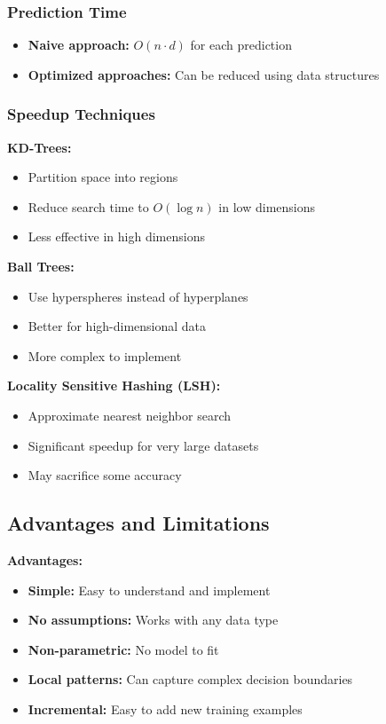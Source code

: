 \subsubsection{Prediction Time}
\begin{itemize}
    \item \textbf{Naive approach:} $O(n \cdot d)$ for each prediction
    \item \textbf{Optimized approaches:} Can be reduced using data structures
\end{itemize}

\subsubsection{Speedup Techniques}

\textbf{KD-Trees:}
\begin{itemize}
    \item Partition space into regions
    \item Reduce search time to $O(\log n)$ in low dimensions
    \item Less effective in high dimensions
\end{itemize}

\textbf{Ball Trees:}
\begin{itemize}
    \item Use hyperspheres instead of hyperplanes
    \item Better for high-dimensional data
    \item More complex to implement
\end{itemize}

\textbf{Locality Sensitive Hashing (LSH):}
\begin{itemize}
    \item Approximate nearest neighbor search
    \item Significant speedup for very large datasets
    \item May sacrifice some accuracy
\end{itemize}

\subsection{Advantages and Limitations}

\textbf{Advantages:}
\begin{itemize}
    \item \textbf{Simple:} Easy to understand and implement
    \item \textbf{No assumptions:} Works with any data type
    \item \textbf{Non-parametric:} No model to fit
    \item \textbf{Local patterns:} Can capture complex decision boundaries
    \item \textbf{Incremental:} Easy to add new training examples
\end{itemize}

